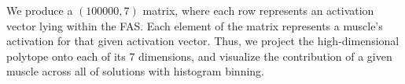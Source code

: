 

We produce a $(100000,7)$ matrix, where each row represents an activation vector lying within the FAS. Each element of the matrix represents a muscle's activation for that given activation vector. Thus, we project the high-dimensional polytope onto each of its 7 dimensions, and visualize the contribution of a given muscle across all of solutions with histogram binning.


